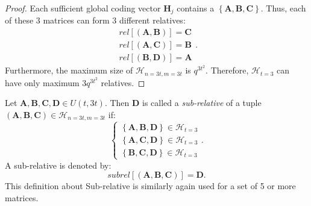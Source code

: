 \begin{proof}
Each sufficient global coding vector $\boldsymbol{H}_{j}$ contains
a $\left\{ \boldsymbol{A},\boldsymbol{B},\boldsymbol{C}\right\} $.
Thus, each of these 3 matrices can form 3 different relatives:
\[
\begin{array}{c}
rel\left[\left(\boldsymbol{A},\boldsymbol{B}\right)\right]=\boldsymbol{C}\\
rel\left[\left(\boldsymbol{A},\boldsymbol{C}\right)\right]=\boldsymbol{B}\\
rel\left[\left(\boldsymbol{B},\boldsymbol{D}\right)\right]=\boldsymbol{A}
\end{array}.
\]
Furthermore, the maximum size of $\mathcal{H}_{n=3t,m=3t}$ is $q^{3t^{2}}$.
Therefore, $\mathcal{H}_{t=3}$ can have only maximum $3q^{3t^{2}}$
relatives.
\end{proof}
\begin{defn}
 Let $\boldsymbol{A},\boldsymbol{B},\boldsymbol{C},\boldsymbol{D}\in U(t,3t)$.
Then $\boldsymbol{D}$ is called a \textit{sub-relative} of a tuple
$\left(\boldsymbol{A},\boldsymbol{B},\boldsymbol{C}\right)\in\mathcal{H}_{n=3t,m=3t}$
if:
\[
\left\{ \begin{array}{c}
\left\{ \boldsymbol{A},\boldsymbol{B},\boldsymbol{D}\right\} \in\mathcal{H}_{t=3}\\
\left\{ \boldsymbol{A},\boldsymbol{C},\boldsymbol{D}\right\} \in\mathcal{H}_{t=3}\\
\left\{ \boldsymbol{B},\boldsymbol{C},\boldsymbol{D}\right\} \in\mathcal{H}_{t=3}
\end{array}\right..
\]
A sub-relative is denoted by: 
\[
subrel\left[\left(\boldsymbol{A},\boldsymbol{B},\boldsymbol{C}\right)\right]=\boldsymbol{D}.
\]
This definition about Sub-relative is similarly again used for a set
of 5 or more matrices.
\end{defn}
